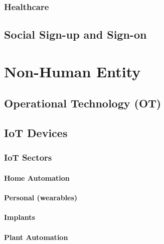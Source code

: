 \hypertarget{healthcare}{%
\subsection{Healthcare}\label{healthcare}}

\hypertarget{social-sign-up-and-sign-on}{%
\section{Social Sign-up and
Sign-on}\label{social-sign-up-and-sign-on}}

\hypertarget{non-human-entity}{%
\chapter{Non-Human Entity}\label{non-human-entity}}

\hypertarget{operational-technology-ot}{%
\section{Operational Technology
(OT)}\label{operational-technology-ot}}

\hypertarget{iot-devices}{%
\section{IoT Devices}\label{iot-devices}}

\hypertarget{iot-sectors}{%
\subsection{IoT Sectors}\label{iot-sectors}}

\hypertarget{home-automation}{%
\subsubsection{Home Automation}\label{home-automation}}

\hypertarget{personal-wearables}{%
\subsubsection{Personal (wearables)}\label{personal-wearables}}

\hypertarget{implants}{%
\subsubsection{Implants}\label{implants}}

\hypertarget{plant-automation}{%
\subsubsection{Plant Automation}\label{plant-automation}}

